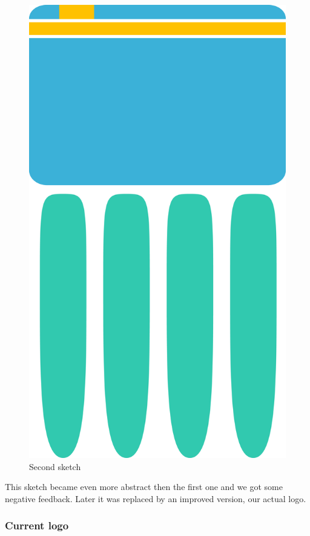 \begin{figure}
\centering
\includegraphics[scale=0.30]{images/logo_v02.png}
\caption{Second sketch}
\end{figure}

This sketch became even more abstract then the first one and we got some negative feedback. Later it was replaced by an improved version, our actual logo.

\subsubsection{Current logo}

